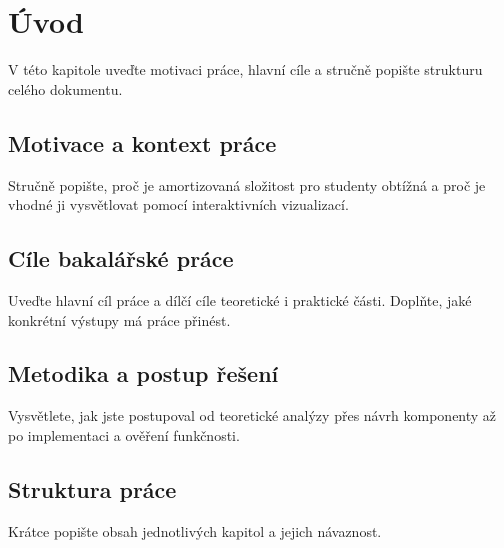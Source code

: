 \chapter{Úvod}

V této kapitole uveďte motivaci práce, hlavní cíle a stručně popište strukturu celého dokumentu.

\section{Motivace a kontext práce}
Stručně popište, proč je amortizovaná složitost pro studenty obtížná a proč je vhodné ji vysvětlovat pomocí interaktivních vizualizací.

\section{Cíle bakalářské práce}
Uveďte hlavní cíl práce a dílčí cíle teoretické i praktické části. Doplňte, jaké konkrétní výstupy má práce přinést.

\section{Metodika a postup řešení}
Vysvětlete, jak jste postupoval od teoretické analýzy přes návrh komponenty až po implementaci a ověření funkčnosti.

\section{Struktura práce}
Krátce popište obsah jednotlivých kapitol a jejich návaznost.
